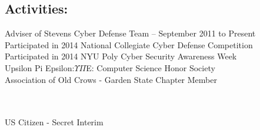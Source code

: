 \documentclass[mm]{res}
\begin{document}
\begin{resume}
\section{Activities:}
Adviser of Stevens Cyber Defense Team – September 2011 to Present \\
Participated in 2014 National Collegiate Cyber Defense  Competition \\
Participated in 2014 NYU Poly Cyber Security Awareness Week \\
Upsilon Pi Epsilon:$\Upsilon$$\Pi$E: Computer Science Honor Society \\
Association of Old Crows - Garden State Chapter Member  \\ 
\\
\end{resume} 
\centerline{\\ US Citizen - Secret Interim} 
\end{document}
